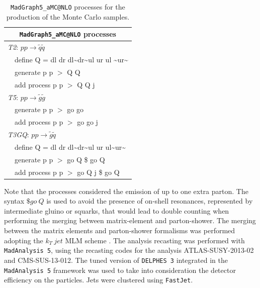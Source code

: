 \documentclass[a4paper,11pt]{article}
\newcommand{\TGQ}{ \textit{T3GQ}}
\newcommand{\Ttwo}{ \textit{T2}}
\newcommand{\Tfive}{ \textit{T5}}
\begin{document}
\begin{table}
	\small
	\begin{center}
		\renewcommand{\arraystretch}{1.0}
		\begin{tabular}{ l l }  \toprule  \toprule 
			\multicolumn{2}{c}{\texttt{MadGraph5\_aMC@NLO} processes} \\ \toprule \toprule
			\multicolumn{2}{l}{\Ttwo: $p p \rightarrow \tilde q \tilde q$}  \\
			& define Q = dl dr dl\textasciitilde dr\textasciitilde ul ur ul \textasciitilde ur\textasciitilde \\
			& generate p p $>$ Q Q  \\
			&  add process p p $>$ Q Q j \\  \toprule 
			\multicolumn{2}{l}{\Tfive: $p p \rightarrow \tilde g \tilde g$ } \\ 
			& generate p p $>$ go go \\
			&  add process p p $>$ go go j \\ \toprule 
			\multicolumn{2}{l}{\TGQ: $p p \rightarrow \tilde g \tilde q$} \\  
			&  define Q = dl dr dl\textasciitilde dr\textasciitilde ul ur ul\textasciitilde ur\textasciitilde \\
			&  generate p p $>$ go Q \$ go Q \\
			&  add process p p $>$ go Q j \$ go Q \\  \bottomrule \bottomrule 
		\end{tabular}
	\end{center}
	\normalsize
	\caption{\texttt{MadGraph5\_aMC@NLO} processes for the production of the Monte Carlo samples.}
	\label{mg5_processes}

\end{table}
Note that the processes considered the emission of up to one extra parton. The syntax $\$go \ Q$ is used to avoid the presence of on-shell resonances, represented by intermediate gluino or squarks, that would lead to double counting when performing the merging between matrix-element and parton-shower. The merging between the matrix elements and parton-shower formalisms was performed adopting the $k_T \ jet$ MLM scheme \cite{MLM,Alwall:2007fs}. 
%
The analysis recasting was performed with \texttt{MadAnalysis 5}, using the recasting codes for the analysis ATLAS-SUSY-2013-02\cite{ATLAS-SUSY-2013-02MA5,ATLAS-SUSY-2013-02VALIDATION} and CMS-SUS-13-012\cite{CMS-SUS-13-012MA5,CMS-SUS-13-012VALIDATION}. The tuned version of \texttt{DELPHES 3} integrated in the \texttt{MadAnalysis 5} framework was used to take into consideration the detector efficiency on the particles. Jets were clustered using \texttt{FastJet}\cite{Cacciari:2011ma}.
\end{document}

